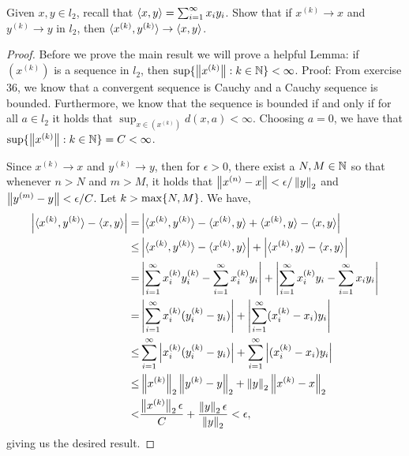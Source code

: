 \begin{exercise}{41}
Given $x,y\in l_2$, recall that $\langle x,y\rangle=\sum_{i=1}^\infty x_iy_i$. Show that if $x^{(k)}\to x$ and $y^{(k)}\to y$ in $l_2$, then $\langle x^{(k)},y^{(k)}\rangle\to\langle x,y\rangle$.
\end{exercise}
\begin{proof}
Before we prove the main result we will prove a helpful Lemma: if $(x^{(k)})$ is a sequence in $l_2$, then $\sup\{\left\lVert x^{(k)}\right\rVert: k\in\mathbb{N}\}<\infty$. Proof: From exercise 36, we know that a convergent sequence is Cauchy and a Cauchy sequence is bounded. Furthermore, we know that the sequence is bounded if and only if for all $a\in l_2$ it holds that $\sup_{x\in (x^{(k)})}d(x, a)<\infty$. Choosing $a=0$, we have that $\sup\{\left\lVert x^{(k)}\right\rVert:k\in\mathbb{N}\}=C<\infty$.

Since $x^{(k)}\to x$ and $y^{(k)}\to y$, then for $\epsilon>0$, there exist a $N,M\in\mathbb{N}$ so that whenever $n>N$ and $m>M$, it holds that $\left\lVert x^{(n)}-x\right\rVert<\epsilon/\left\lVert y\right\rVert_2$ and $\left\lVert y^{(m)}-y\right\rVert<\epsilon/C$. Let $k>\max\{N,M\}$. We have,
\begin{align*}
    \left\lvert \langle x^{(k)}, y^{(k)}\rangle-\langle x,y\rangle\right\rvert
    =& \left\lvert \langle x^{(k)}, y^{(k)}\rangle- \langle x^{(k)}, y\rangle + \langle x^{(k)}, y\rangle -\langle x,y\rangle\right\rvert\\
    \leq& \left\lvert \langle x^{(k)}, y^{(k)}\rangle- \langle x^{(k)}, y\rangle\right\rvert
    + \left\lvert \langle x^{(k)}, y\rangle -\langle x,y\rangle\right\rvert\\
    =& \left\lvert \sum_{i=1}^\infty x^{(k)}_iy^{(k)}_i -\sum_{i=1}^\infty x^{(k)}_iy_i\right\rvert
    + \left\lvert \sum_{i=1}^\infty x^{(k)}_iy_i -\sum_{i=1}^\infty x_iy_i\right\rvert\\
    =& \left\lvert \sum_{i=1}^\infty x^{(k)}_i(y^{(k)}_i -y_i)\right\rvert
    + \left\lvert \sum_{i=1}^\infty (x^{(k)}_i-x_i)y_i\right\rvert\\
    \leq& \sum_{i=1}^\infty \left\lvert x^{(k)}_i(y^{(k)}_i -y_i)\right\rvert
    + \sum_{i=1}^\infty \left\lvert (x^{(k)}_i-x_i)y_i\right\rvert\\
    \leq& \left\lVert x^{(k)}\right\rVert_2\left\lVert y^{(k)}-y\right\rVert_2
    + \left\lVert y\right\rVert_2\left\lVert x^{(k)}-x\right\rVert_2\\
    <& \frac{\left\lVert x^{(k)}\right\rVert_2\epsilon}{C} + \frac{\left\lVert y\right\rVert_2\epsilon}{\left\lVert y\right\rVert_2} < \epsilon,
\end{align*}
giving us the desired result.
\end{proof} 

